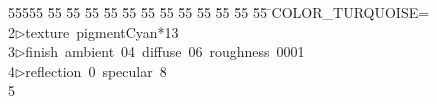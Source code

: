 %
%
\begin{tabbing}
55555 \= 55 \= 55 \= 55 \= 55 \= 55 \= 55 \= 55 \= 55 \= 55 \= 55 \= 55 \= 55 \= \>COLOR\_TURQUOISE=\\[0pt]
2\>$\triangleright$\>texture\ pigmentCyan*13\ \\[0pt]
3\>$\triangleright$\>finish\ ambient\ 04\ diffuse\ 06\ roughness\ 0001\ \\[0pt]
4\>$\triangleright$\>reflection\ 0\ specular\ 8\ \\[0pt]
5\>\end{tabbing}
